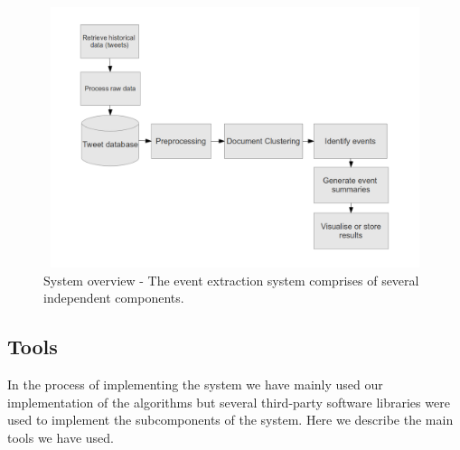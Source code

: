 \begin{figure}[htbp]
  \begin{center}
    \includegraphics[height=3in, width=6in]{system-overview}
    \caption{System overview - The event extraction system comprises of several independent components.}
    \label{SystemOverview}
  \end{center}
\end{figure}

\subsection{Tools}
In the process of implementing the system we have mainly used our implementation of the algorithms but several third-party 
software libraries were used to implement the subcomponents of the system. Here we describe the main tools we have used.\\ 

